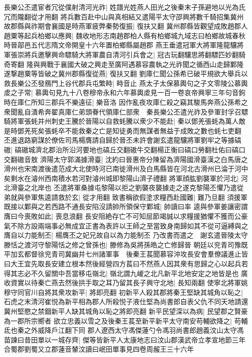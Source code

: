 長樂公丕遣宦者冗從僕射清河光祚|{
	姓譜光姓燕人田光之後秦末子孫避地以光為氏冗而隴翻從才用翻}
將兵數百赴中山與真相結又遣陽平太守邵興將數千騎招集冀州故郡縣與祚期會襄國是時燕軍疲弊秦勢復振|{
	復扶又翻}
冀州郡縣皆觀望成敗趙郡人趙粟等起兵柏鄉以應興|{
	魏收地形志南趙郡柏人縣有柏鄉城九域志曰柏鄉故城春秋時晉鄗邑五代志隋文帝開皇十六年置柏鄉縣屬趙郡}
燕王垂遣冠軍大將軍隆龍驤將軍張崇將兵邀擊興命驃騎大將軍農自清河引兵會之|{
	冠古玩翻驤思將翻驃匹妙翻騎奇寄翻}
隆與興戰于襄國大破之興走至廣阿遇慕容農執之光祚聞之循西山走歸鄴隆遂撃趙粟等皆破之冀州郡縣復從燕|{
	復扶又翻}
劉庫仁聞公孫希已破平規欲大舉兵以救長樂公丕發鴈門上谷代郡兵屯繁畤|{
	畤音止}
燕太子太保慕輿句之子文零陵公慕輿䖍之子常|{
	慕輿句見九十八卷穆帝永和六年慕輿䖍見一百一卷哀帝興寧三年句音鉤}
時在庫仁所知三郡兵不樂遠征|{
	樂音洛}
因作亂夜攻庫仁殺之竊其駿馬奔燕公孫希之衆聞亂自潰希奔翟真庫仁弟頭眷代領庫仁部衆　秦長樂公丕遣光祚及參軍封孚召驃騎將軍張蚝并州刺史王騰於晉陽以自救蚝騰以衆少不能赴|{
	秦以鄧羌張蚝為萬人敵是時鄧羌死矣張蚝卒不能救秦之亡是知徒勇而無謀者無益于成敗之數也蚝七吏翻}
丕進退路窮謀於僚佐司馬楊膺請自歸於晉丕未許會謝玄遣龍驤將軍劉牢之等據碻磝|{
	碻磝城濟北郡治所沿河要地也碻丘交翻磝牛交翻楊正衡曰碻口勞翻杜佑曰碻口交翻磝音敖}
濟陽太守郭滿據滑臺|{
	沈約曰晉惠帝分陳留為濟陽國滑臺漢之白馬唐之滑州也宋南渡後遣范成大北使時河已南徙滑州及白馬縣皆在河北古滑州已淪于河中矣剩水在濬州西南積水若河對濬州城即黎陽山濟子禮翻}
將軍顔肱劉襲軍於河北|{
	河北滑臺之北岸也}
丕遣將軍桑據屯黎陽以拒之劉襲夜襲據走之遂克黎陽丕懼乃遣從弟就與參軍焦逵請救於玄|{
	從才用翻}
致書稱欲假塗求糧西赴國難|{
	難乃旦翻}
須援軍既接以鄴與之若西路不通長安陷沒請帥所領保守鄴城|{
	帥讀曰率}
逵與參軍姜讓密謂膺曰今喪敗如此|{
	喪息浪翻}
長安阻絶存亡不可知屈節竭誠以求糧援猶懼不獲而公豪氣不除方設兩端事必無成宜正書為表許以王師之至當致身南歸如其不從可逼縛與之膺自以力能制丕|{
	楊膺丕之妃兄故自以為力能制丕}
乃改書而遣之　謝玄遣晉陵太守滕恬之渡河守黎陽恬之修之曾孫也|{
	滕修為吳將孫皓之亡修歸晉}
朝廷以兖青司豫既平加玄都督徐兖青司冀幽并七州諸軍事　後秦王萇聞慕容沖攻長安會羣僚議進止皆曰大王宜先取長安建立根本然後經營四方萇曰不然燕人因其衆有思歸之心以起兵若得其志必不久留關中吾當移屯嶺北|{
	嶺北謂九嵕之北凡新平北地安定之地皆是也}
廣收資實以待秦亡燕去然後拱手取之耳乃留其長子興守北地|{
	長知兩翻}
使寧北將軍姚穆守同官川自將其衆攻新平|{
	將即亮翻}
初新平人殺其郡將秦王堅缺其城角以恥之|{
	石虎之末清河崔悦為新平相為郡人所殺悦子液仕堅為尚書郎自表父仇不同天地請還冀州堅愍之禁錮新平人缺其城角以恥之將即亮翻}
新平民望深以為病|{
	民望郡之賢豪為一郡所宗嚮者}
欲立忠義以雪之及後秦王萇至新平新平太守南安苟輔欲降之|{
	苟輔氐也秦之外威降戶江翻下同}
郡人遼西太守馮傑蓮勺令馮羽尚書郎趙義汶山太守馮苗諫曰昔田單以一城存齊|{
	傑等皆新平人太康地志曰汶山郡漢武帝立孝宣地節三年合蜀郡劉蜀又立郡蓮音輦汶讀曰岷田單事見四卷周赧王三十六年}
